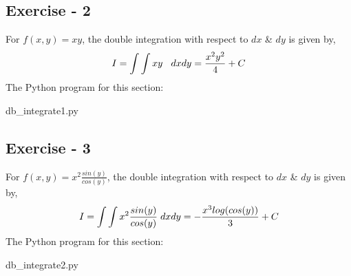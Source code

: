 \documentclass{article}
\begin{document}
\subsection{Exercise - 2}
For $f(x,y) = xy$, the double integration with respect to $dx$ \& $dy$ is given by,
\begin{equation}
I = \int \int xy\hspace{0.3cm} dxdy = \frac{x^{2}y^{2}}{4}+C
\end{equation}
The Python program for this section:

{db_integrate1.py}
\newpage
\subsection{Exercise - 3}
For $f(x,y) = x^{2}\frac{sin(y)}{cos(y)}$, the double integration with respect to $dx$ \& $dy$ is given by,
\begin{equation}
I = \int \int x^{2}\frac{sin(y)}{cos(y)}\hspace{0.1cm} dxdy = -\frac{x^{3}log(cos(y))}{3}+C
\end{equation}
The Python program for this section:

{db_integrate2.py}
\end{document}
